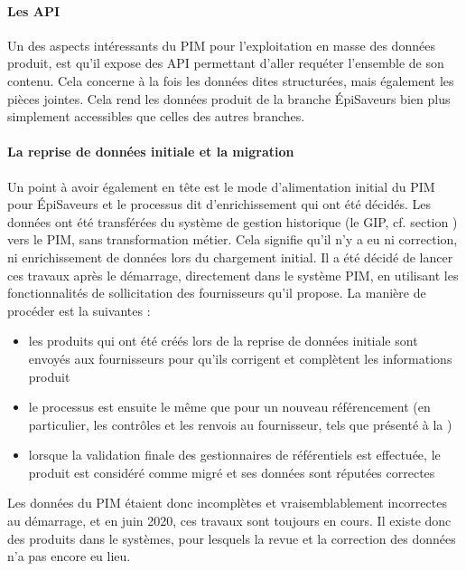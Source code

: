                 \paragraph{Les API}

                Un des aspects intéressants du PIM pour l'exploitation en masse des données produit, est qu'il expose des API permettant d'aller requéter l'ensemble de son contenu.
                Cela concerne à la fois les données dites structurées, mais également les pièces jointes.
                Cela rend les données produit de la branche \'{E}piSaveurs bien plus simplement accessibles que celles des autres branches.

                \paragraph{La reprise de données initiale et la migration}
                \label{migration}

                Un point à avoir également en tête est le mode d'alimentation initial du PIM pour \'{E}piSaveurs et le processus dit d'enrichissement qui ont été décidés.
                Les données ont été transférées du système de gestion historique (le GIP, cf. section ) vers le PIM, sans transformation métier.
                Cela signifie qu'il n'y a eu ni correction, ni enrichissement de données lors du chargement initial.
                Il a été décidé de lancer ces travaux après le démarrage, directement dans le système PIM, en utilisant les fonctionnalités de sollicitation des fournisseurs qu'il propose.
                La manière de procéder est la suivantes :
                \begin{itemize}
                    \item les produits qui ont été créés lors de la reprise de données initiale sont envoyés aux fournisseurs pour qu'ils corrigent et complètent les informations produit
                    \item le processus est ensuite le même que pour un nouveau référencement (en particulier, les contrôles et les renvois au fournisseur, tels que présenté à la )
                    \item lorsque la validation finale des gestionnaires de référentiels est effectuée, le produit est considéré comme \og migré \fg et ses données sont réputées correctes
                \end{itemize}

                Les données du PIM étaient donc incomplètes et vraisemblablement incorrectes au démarrage, et en juin 2020, ces travaux sont toujours en cours.
                Il existe donc des produits dans le systèmes, pour lesquels la revue et la correction des données n'a pas encore eu lieu.
                

